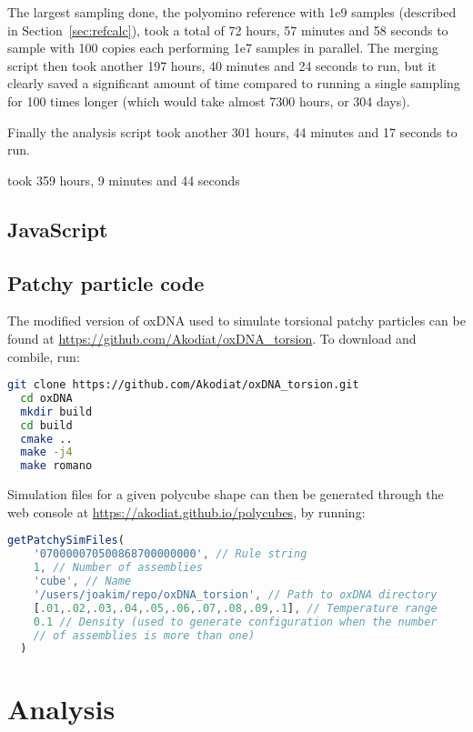 The largest sampling done, the polyomino reference with 1e9 samples (described in Section~\ref{sec:refcalc}), took a total of 72 hours, 57 minutes and 58 seconds to sample with 100 copies each performing 1e7 samples in parallel. The merging script then took another 197 hours, 40 minutes and 24 seconds to run, but it clearly saved a significant amount of time compared to running a single sampling for 100 times longer (which would take almost 7300 hours, or 304 days).

Finally the analysis script took another 301 hours, 44 minutes and 17 seconds to run.

took 359 hours, 9 minutes and 44 seconds

\subsection{JavaScript}

\subsection{Patchy particle code}
\label{sec:appendix_patchy}
The modified version of oxDNA used to simulate torsional patchy particles can be found at \url{https://github.com/Akodiat/oxDNA_torsion}. To download and combile, run:

\begin{lstlisting}[language=bash]
  git clone https://github.com/Akodiat/oxDNA_torsion.git
  cd oxDNA
  mkdir build
  cd build
  cmake ..
  make -j4
  make romano
\end{lstlisting}

Simulation files for a given polycube shape can then be generated through the web console at \url{https://akodiat.github.io/polycubes}, by running:

\begin{lstlisting}[language=JavaScript]
  getPatchySimFiles(
    '070000070500868700000000', // Rule string
    1, // Number of assemblies
    'cube', // Name
    '/users/joakim/repo/oxDNA_torsion', // Path to oxDNA directory
    [.01,.02,.03,.04,.05,.06,.07,.08,.09,.1], // Temperature range
    0.1 // Density (used to generate configuration when the number
    // of assemblies is more than one)
  )
\end{lstlisting}


\section{Analysis}

